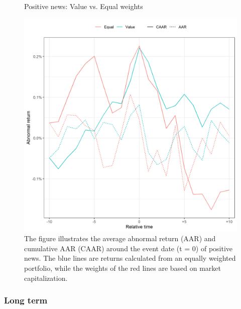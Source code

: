 \begin{figure} [H]
    \centering
    \caption{Positive news: Value vs. Equal weights}
    \includegraphics[scale=0.6]{Projekt/1.Figures analysis/ST_positive_sensitivity_weight.png}
     \caption*{\footnotesize The figure illustrates the average abnormal return (AAR) and cumulative AAR (CAAR) around the event date (t = 0) of positive news. The blue lines are returns calculated from an equally weighted portfolio, while the weights of the red lines are based on market capitalization. }
    \label{fig:ST_pos_sensitivity_weights}
\end{figure} 

\subsubsection{Long term}


